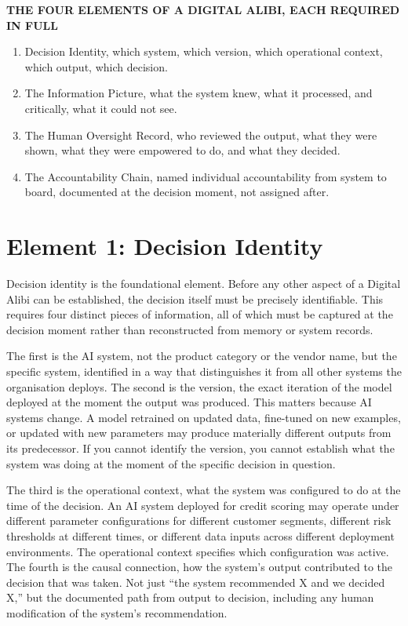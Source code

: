 \textbf{THE FOUR ELEMENTS OF A DIGITAL ALIBI, EACH REQUIRED IN FULL}

\begin{enumerate}
\def\labelenumi{\arabic{enumi}.}
\tightlist
\item
  Decision Identity, which system, which version, which operational context, which output, which decision.
\item
  The Information Picture, what the system knew, what it processed, and critically, what it could not see.
\item
  The Human Oversight Record, who reviewed the output, what they were shown, what they were empowered to do, and what they decided.
\item
  The Accountability Chain, named individual accountability from system to board, documented at the decision moment, not assigned after.
\end{enumerate}

\section{Element 1: Decision Identity}

Decision identity is the foundational element. Before any other aspect of a Digital Alibi can be established, the decision itself must be precisely identifiable. This requires four distinct pieces of information, all of which must be captured at the decision moment rather than reconstructed from memory or system records.

The first is the AI system, not the product category or the vendor name, but the specific system, identified in a way that distinguishes it from all other systems the organisation deploys. The second is the version, the exact iteration of the model deployed at the moment the output was produced. This matters because AI systems change. A model retrained on updated data, fine-tuned on new examples, or updated with new parameters may produce materially different outputs from its predecessor. If you cannot identify the version, you cannot establish what the system was doing at the moment of the specific decision in question.

The third is the operational context, what the system was configured to do at the time of the decision. An AI system deployed for credit scoring may operate under different parameter configurations for different customer segments, different risk thresholds at different times, or different data inputs across different deployment environments. The operational context specifies which configuration was active. The fourth is the causal connection, how the system's output contributed to the decision that was taken. Not just ``the system recommended X and we decided X,'' but the documented path from output to decision, including any human modification of the system's recommendation.


